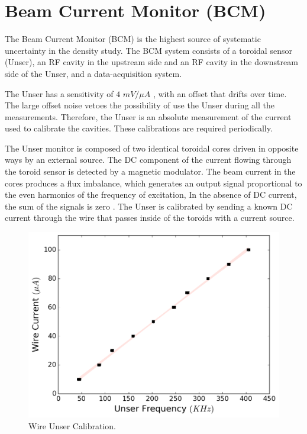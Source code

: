 \documentclass[final,5p,times,twocolumn]{elsarticle}
\begin{document}
\section{Beam Current Monitor (BCM)}
\label{BCM}

The Beam Current Monitor (BCM) is the highest source of systematic uncertainty in the density study. The BCM system consists of a toroidal sensor (Unser), an RF cavity in the upstream side and an RF cavity in the downstream side of the Unser, and a data-acquisition system.  

The Unser has a sensitivity of $4$ $mV/\mu A$ \cite{denard}, with an offset that drifts over time. The large offset noise vetoes the possibility of use the Unser during all the measurements. Therefore, the Unser is an absolute measurement of the current used to calibrate the cavities. These calibrations are required periodically.

The Unser monitor is composed of two identical toroidal cores driven in opposite ways by an external source.  The DC component of the current flowing through the toroid sensor is detected by a magnetic modulator. The beam current in the cores produces a flux imbalance, which generates an output signal proportional to the even harmonics of the frequency of excitation, In the absence of DC current, the sum of the signals is zero \cite{denard}. The Unser is calibrated by sending a known DC current through the wire that passes inside of the toroids with a current source.  


\begin{figure}[!h]
    \centering
    \includegraphics[width=\linewidth]{images/unser_calibration.pdf}
    \caption{Wire Unser Calibration.}
    \label{fig:unser_cal}
\end{figure}
  
\end{document}
